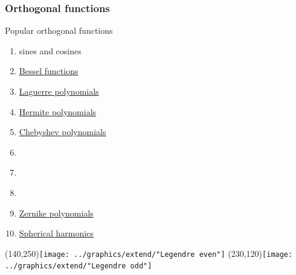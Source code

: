 \documentclass[handout]{beamer}
\begin{document}
\begin{frame}      %
\frametitle{Orthogonal functions}
  Popular orthogonal functions
  \begin{enumerate}
    \item sines and cosines
    \item \href{http://mathworld.wolfram.com/BesselFunction.html}{Bessel functions}
    \item \href{http://mathworld.wolfram.com/LaguerrePolynomial.html}{Laguerre polynomials}
    \item \href{http://mathworld.wolfram.com/HermitePolynomial.html}{Hermite polynomials}
    \item \href{http://mathworld.wolfram.com/ChebyshevPolynomialoftheFirstKind.html}{Chebyshev polynomials}
    \item \href{http://mathworld.wolfram.com/LegendrePolynomial.html}{}
    \item \href{http://mathworld.wolfram.com/JacobiPolynomial.html}{}
    \item \href{http://mathworld.wolfram.com/GegenbauerPolynomial.html}{}
    \item \href{http://mathworld.wolfram.com/ZernikePolynomial.html}{Zernike polynomials}
    \item \href{http://mathworld.wolfram.com/SphericalHarmonic.html}{Spherical harmonics}
  \end{enumerate}
    \Put(140,250){\texttt{[image: ../graphics/extend/"Legendre even"]}}
    \Put(230,120){\texttt{[image: ../graphics/extend/"Legendre odd"]}}
\end{frame}
\end{document}
